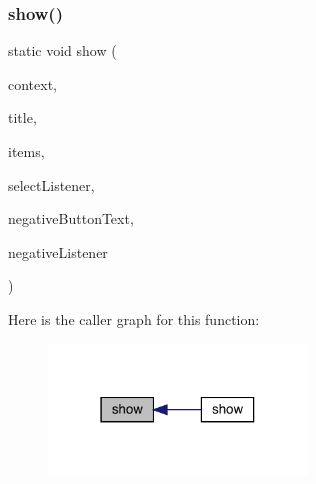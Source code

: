 \subsubsection{\texorpdfstring{show()}{show()}\hspace{0.1cm}{\footnotesize\ttfamily [1/3]}}
{\footnotesize\ttfamily static void show (\begin{DoxyParamCaption}\item[{@Non\+Null final Context}]{context,  }\item[{@Non\+Null final String}]{title,  }\item[{@Non\+Null final List$<$ String $>$}]{items,  }\item[{@Nullable final Dialog\+Interface.\+On\+Click\+Listener}]{select\+Listener,  }\item[{@Nullable final String}]{negative\+Button\+Text,  }\item[{@Nullable final Dialog\+Interface.\+On\+Click\+Listener}]{negative\+Listener }\end{DoxyParamCaption})\hspace{0.3cm}{\ttfamily [static]}}

Here is the caller graph for this function\+:
\nopagebreak
\begin{figure}[H]
\begin{center}
\leavevmode
\includegraphics[width=195pt]{classcom_1_1toast_1_1android_1_1gamebase_1_1base_1_1ui_1_1_simple_select_item_dialog_a8b2c1b884c6b4f4aea1a57d305ae57b5_icgraph}
\end{center}
\end{figure}
\mbox{\label{classcom_1_1toast_1_1android_1_1gamebase_1_1base_1_1ui_1_1_simple_select_item_dialog_a453bc4d484f85949532ce8198bd9e9de}} 
